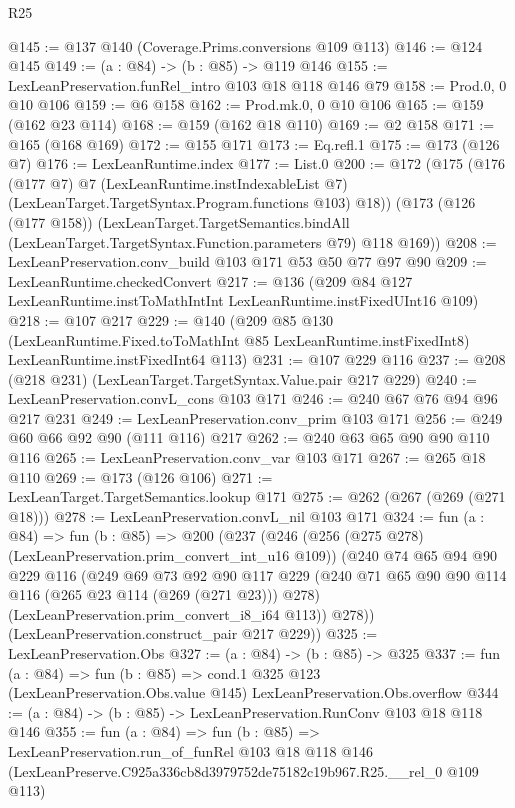 \begin{lexlean}{R25}
\begin{coremodule}
@145 := @137 @140 (Coverage.Prims.conversions @109 @113)
@146 := @124 @145
@149 := (a : @84) -> (b : @85) -> @119 @146
@155 := LexLeanPreservation.funRel_intro @103 @18 @118 @146 @79
@158 := Prod.{0, 0} @10 @106
@159 := @6 @158
@162 := Prod.mk.{0, 0} @10 @106
@165 := @159 (@162 @23 @114)
@168 := @159 (@162 @18 @110)
@169 := @2 @158
@171 := @165 (@168 @169)
@172 := @155 @171
@173 := Eq.refl.{1}
@175 := @173 (@126 @7)
@176 := LexLeanRuntime.index
@177 := List.{0}
@200 := @172
    (@175
      (@176
        (@177 @7)
        @7
        (LexLeanRuntime.instIndexableList @7)
        (LexLeanTarget.TargetSyntax.Program.functions @103)
        @18))
    (@173
      (@126 (@177 @158))
      (LexLeanTarget.TargetSemantics.bindAll
        (LexLeanTarget.TargetSyntax.Function.parameters @79)
        @118
        @169))
@208 := LexLeanPreservation.conv_build @103 @171 @53 @50 @77 @97 @90
@209 := LexLeanRuntime.checkedConvert
@217 := @136 (@209 @84 @127 LexLeanRuntime.instToMathIntInt LexLeanRuntime.instFixedUInt16 @109)
@218 := @107 @217
@229 := @140
    (@209
      @85
      @130
      (LexLeanRuntime.Fixed.toToMathInt @85 LexLeanRuntime.instFixedInt8)
      LexLeanRuntime.instFixedInt64
      @113)
@231 := @107 @229 @116
@237 := @208 (@218 @231) (LexLeanTarget.TargetSyntax.Value.pair @217 @229)
@240 := LexLeanPreservation.convL_cons @103 @171
@246 := @240 @67 @76 @94 @96 @217 @231
@249 := LexLeanPreservation.conv_prim @103 @171
@256 := @249 @60 @66 @92 @90 (@111 @116) @217
@262 := @240 @63 @65 @90 @90 @110 @116
@265 := LexLeanPreservation.conv_var @103 @171
@267 := @265 @18 @110
@269 := @173 (@126 @106)
@271 := LexLeanTarget.TargetSemantics.lookup @171
@275 := @262 (@267 (@269 (@271 @18)))
@278 := LexLeanPreservation.convL_nil @103 @171
@324 := fun (a : @84) =>
  fun (b : @85) =>
  @200
    (@237
      (@246
        (@256 (@275 @278) (LexLeanPreservation.prim_convert_int_u16 @109))
        (@240
          @74
          @65
          @94
          @90
          @229
          @116
          (@249
            @69
            @73
            @92
            @90
            @117
            @229
            (@240 @71 @65 @90 @90 @114 @116 (@265 @23 @114 (@269 (@271 @23))) @278)
            (LexLeanPreservation.prim_convert_i8_i64 @113))
          @278))
      (LexLeanPreservation.construct_pair @217 @229))
@325 := LexLeanPreservation.Obs
@327 := (a : @84) -> (b : @85) -> @325
@337 := fun (a : @84) =>
  fun (b : @85) =>
  cond.{1} @325 @123 (LexLeanPreservation.Obs.value @145) LexLeanPreservation.Obs.overflow
@344 := (a : @84) -> (b : @85) -> LexLeanPreservation.RunConv @103 @18 @118 @146
@355 := fun (a : @84) =>
  fun (b : @85) =>
  LexLeanPreservation.run_of_funRel
    @103
    @18
    @118
    @146
    (LexLeanPreserve.C925a336cb8d3979752de75182c19b967.R25.__rel_0 @109 @113)
\end{coremodule}
\end{lexlean}
